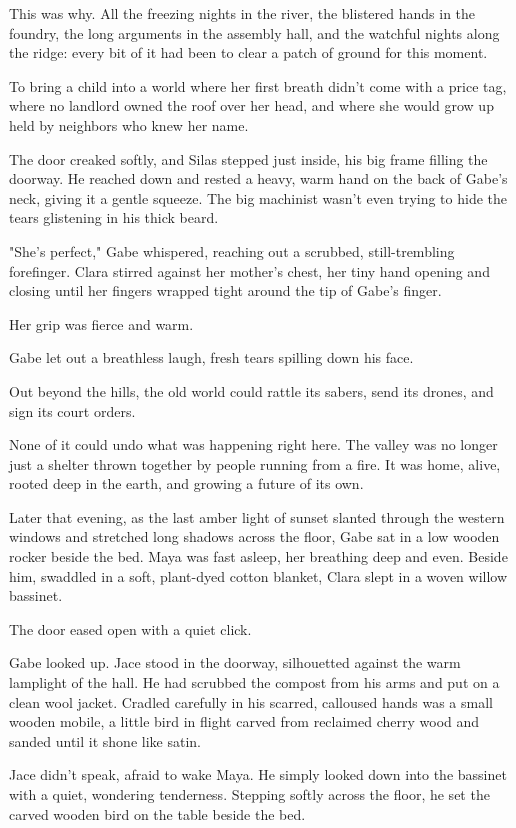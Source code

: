 This was why. All the freezing nights in the river, the blistered hands in the foundry, the long arguments in the assembly hall, and the watchful nights along the ridge: every bit of it had been to clear a patch of ground for this moment. 

To bring a child into a world where her first breath didn't come with a price tag, where no landlord owned the roof over her head, and where she would grow up held by neighbors who knew her name.

The door creaked softly, and Silas stepped just inside, his big frame filling the doorway. He reached down and rested a heavy, warm hand on the back of Gabe’s neck, giving it a gentle squeeze. The big machinist wasn't even trying to hide the tears glistening in his thick beard. 

"She’s perfect," Gabe whispered, reaching out a scrubbed, still-trembling forefinger. Clara stirred against her mother's chest, her tiny hand opening and closing until her fingers wrapped tight around the tip of Gabe’s finger. 

Her grip was fierce and warm. 

Gabe let out a breathless laugh, fresh tears spilling down his face. 

Out beyond the hills, the old world could rattle its sabers, send its drones, and sign its court orders. 

None of it could undo what was happening right here. The valley was no longer just a shelter thrown together by people running from a fire. It was home, alive, rooted deep in the earth, and growing a future of its own.

Later that evening, as the last amber light of sunset slanted through the western windows and stretched long shadows across the floor, Gabe sat in a low wooden rocker beside the bed. Maya was fast asleep, her breathing deep and even. Beside him, swaddled in a soft, plant-dyed cotton blanket, Clara slept in a woven willow bassinet.

The door eased open with a quiet click. 

Gabe looked up. Jace stood in the doorway, silhouetted against the warm lamplight of the hall. He had scrubbed the compost from his arms and put on a clean wool jacket. Cradled carefully in his scarred, calloused hands was a small wooden mobile, a little bird in flight carved from reclaimed cherry wood and sanded until it shone like satin. 

Jace didn't speak, afraid to wake Maya. He simply looked down into the bassinet with a quiet, wondering tenderness. Stepping softly across the floor, he set the carved wooden bird on the table beside the bed. 

